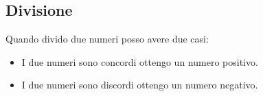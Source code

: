 \subsection{Divisione}
Quando divido due numeri posso avere due casi:
\begin{itemize}
	\item I due numeri sono concordi ottengo un numero positivo.
	\item I due numeri sono discordi ottengo un numero negativo.
\end{itemize}
%		
